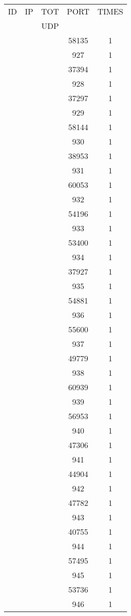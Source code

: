 \documentclass[a4paper]{scrartcl}
\begin{document}
\begin{minipage}[b]{0.5\linewidth}
\begin{tabular}{| c | c | c | c | c |}
\hline
ID & IP & TOT & PORT & TIMES \\ 
   &    & UDP &      &       \\ 
\hline
& & & 58135 & 1 \\ & & & 927 & 1 \\ & & & 37394 & 1 \\ & & & 928 & 1 \\ & & & 37297 & 1 \\ & & & 929 & 1 \\ & & & 58144 & 1 \\ & & & 930 & 1 \\ & & & 38953 & 1 \\ & & & 931 & 1 \\ & & & 60053 & 1 \\ & & & 932 & 1 \\ & & & 54196 & 1 \\ & & & 933 & 1 \\ & & & 53400 & 1 \\ & & & 934 & 1 \\ & & & 37927 & 1 \\ & & & 935 & 1 \\ & & & 54881 & 1 \\ & & & 936 & 1 \\ & & & 55600 & 1 \\ & & & 937 & 1 \\ & & & 49779 & 1 \\ & & & 938 & 1 \\ & & & 60939 & 1 \\ & & & 939 & 1 \\ & & & 56953 & 1 \\ & & & 940 & 1 \\ & & & 47306 & 1 \\ & & & 941 & 1 \\ & & & 44904 & 1 \\ & & & 942 & 1 \\ & & & 47782 & 1 \\ & & & 943 & 1 \\ & & & 40755 & 1 \\ & & & 944 & 1 \\ & & & 57495 & 1 \\ & & & 945 & 1 \\ & & & 53736 & 1 \\ & & & 946 & 1 \\ \hline\end{tabular}\end{minipage} \hfill\begin{minipage}[b]{0.5\linewidth}\begin{tabular}{| c | c | c | c | c |}

\end{tabular}
\end{minipage}
\end{document}
